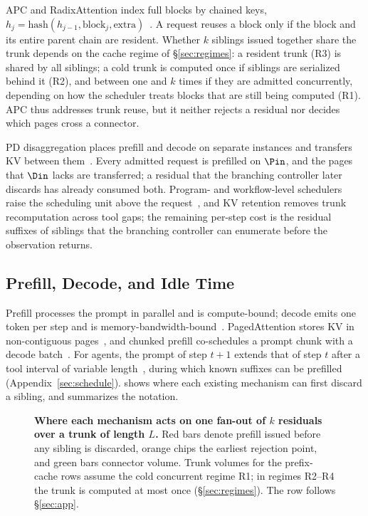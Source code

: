 APC and RadixAttention index full blocks by chained keys, $h_j=\mathrm{hash}(h_{j-1},\text{block}_j,\text{extra})$~\cite{vllm,sglang}.
A request reuses a block only if the block and its entire parent chain are resident.
Whether $k$ siblings issued together share the trunk depends on the cache regime of \S\ref{sec:regimes}: a resident trunk (R3) is shared by all siblings; a cold trunk is computed once if siblings are serialized behind it (R2), and between one and $k$ times if they are admitted concurrently, depending on how the scheduler treats blocks that are still being computed (R1).
APC thus addresses trunk reuse, but it neither rejects a residual nor decides which pages cross a connector.

PD disaggregation places prefill and decode on separate instances and transfers KV between them~\cite{distserve,splitwise}.
Every admitted request is prefilled on $\Pin$, and the pages that $\Din$ lacks are transferred; a residual that the branching controller later discards has already consumed both.
Program- and workflow-level schedulers raise the scheduling unit above the request~\cite{autellix,thunderagent,continuum,mori}, and KV retention removes trunk recomputation across tool gaps; the remaining per-step cost is the residual suffixes of siblings that the branching controller can enumerate before the observation returns.

\subsection{Prefill, Decode, and Idle Time}
Prefill processes the prompt in parallel and is compute-bound; decode emits one token per step and is memory-bandwidth-bound~\cite{orca,distserve,splitwise}.
PagedAttention stores KV in non-contiguous pages~\cite{vllm}, and chunked prefill co-schedules a prompt chunk with a decode batch~\cite{sarathi}.
For agents, the prompt of step $t{+}1$ extends that of step $t$ after a tool interval of variable length~\cite{continuum,mori}, during which known suffixes can be prefilled (Appendix~\ref{sec:schedule}).
 shows where each existing mechanism can first discard a sibling, and  summarizes the notation.

\begin{figure}[t]
\centering
\resizebox{\textwidth}{!}{}
\caption{\textbf{Where each mechanism acts on one fan-out of $k$ residuals over a trunk of length $L$.}
Red bars denote prefill issued before any sibling is discarded, orange chips the earliest rejection point, and green bars connector volume.
Trunk volumes for the prefix-cache rows assume the cold concurrent regime R1; in regimes R2--R4 the trunk is computed at most once (\S\ref{sec:regimes}).
The \sys{} row follows \S\ref{sec:app}.}
\label{fig:trad}
\end{figure}

